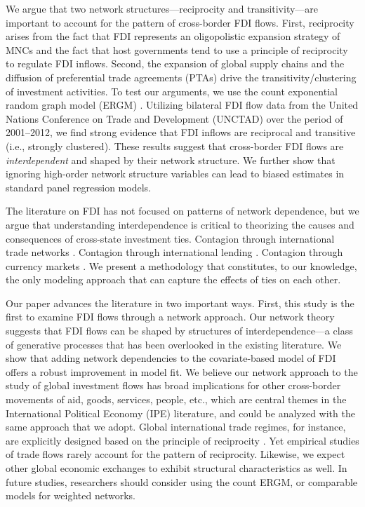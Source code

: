 \documentclass[reqno,onecolumn,letterpaper,12pt]{article}
\begin{document}
We argue that two network structures---reciprocity and transitivity---are important to account for the pattern of cross-border FDI flows. First, reciprocity
arises from the fact that FDI represents an oligopolistic expansion strategy of MNCs and the fact that host governments tend to use a principle of reciprocity
to regulate FDI inflows. Second, the expansion of global supply chains and the diffusion of preferential trade agreements (PTAs) drive the
transitivity/clustering of investment activities. To test our arguments, we use the count exponential random graph model (ERGM) \citep{krivitsky2012exponential}. Utilizing bilateral FDI flow data from the United Nations Conference on Trade and Development (UNCTAD) over the period of 2001--2012, we find strong evidence that FDI inflows are reciprocal and transitive (i.e., strongly clustered). These results suggest that cross-border FDI flows are \textit{interdependent} and shaped by their network structure. We further show that ignoring high-order network structure variables can lead to biased estimates in standard panel regression models.

The literature on FDI has not focused on patterns of network dependence, but we argue that understanding interdependence is critical to theorizing the causes and consequences of cross-state investment ties. Contagion through international trade networks \citep{kali2010financial,chiavo2010international}. Contagion through international lending \citep{gai2010contagion,leitner2005financial,agunoff2001model}. Contagion through currency markets \citep{brida2009symbolic,matesanz2014network}. We present a methodology that constitutes, to our knowledge, the only modeling approach that can capture the effects of ties on each other. 


Our paper advances the literature in two important ways. First, this study is the first to examine FDI flows through a network approach. Our network theory
suggests that FDI flows can be shaped by structures of interdependence---a class of generative processes that has been overlooked in the existing
literature. %
We show that adding network dependencies to the covariate-based model of FDI
offers a robust improvement in model fit. %
We believe our network approach to the study of global investment flows has broad implications for other cross-border movements of aid, goods, services, people, etc., which are central themes in the International Political Economy (IPE) literature, and could be analyzed with the same approach that we adopt. Global international trade regimes, for instance, are explicitly designed based on the principle of reciprocity \citep{Bagwell_Staiger:1999}. Yet empirical studies of trade flows rarely account for the pattern of reciprocity. Likewise, we expect other global economic exchanges to exhibit structural characteristics as well. In future studies, researchers should consider using the count ERGM, or comparable models for weighted networks.
\end{document}
